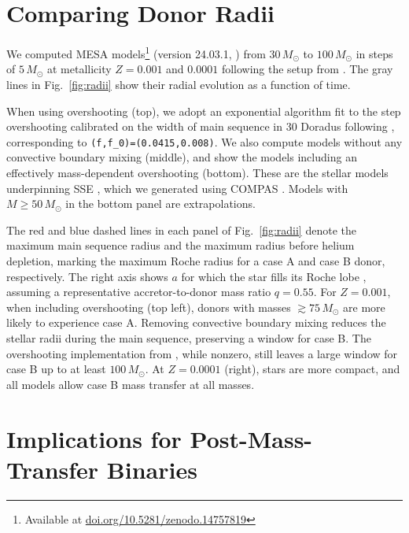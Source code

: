 \documentclass[twocolumn]{aastex631}
\DeclareRobustCommand{\Figref}[1]{Fig.~\ref{#1}}
\begin{document}
\section{Comparing Donor Radii}

We computed \textsc{MESA} models\footnote{Available at
  \href{https://doi.org/10.5281/zenodo.14757819}{doi.org/10.5281/zenodo.14757819}}
(version 24.03.1, \citealt{paxton:11, paxton:13, paxton:15, paxton:18,
  paxton:19, jermyn:23}) from $30 \, M_{\odot}$ to $100 \, M_{\odot}$
in steps of $5\,M_\odot$ at metallicity $Z=0.001$ and $0.0001$
following the setup from \cite{renzo:23}. The gray lines in
\Figref{fig:radii} show their radial evolution as a function of time.

When using overshooting (top), we adopt an exponential algorithm
\citep{herwig:00} fit to the step overshooting calibrated on the width
of main sequence in 30 Doradus \citep[$\sim{}0.335$ pressure scale
heights,][]{brott:11} following \cite{claret:18}, corresponding to
\texttt{(f,f\_0)=(0.0415,0.008)}. We also compute models without any
convective boundary mixing (middle), and show the \cite{pols:98}
models including an effectively mass-dependent overshooting (bottom).
These are the stellar models underpinning \textsc{SSE}
\citep{hurley:00}, which we generated using \textsc{COMPAS}
\citep{stevenson:17, vignagomez:18, riley:22}. Models with
$M\geq50\,M_\odot$ in the bottom panel are extrapolations.

The red and blue dashed lines in each panel of \Figref{fig:radii}
denote the maximum main sequence radius and the maximum radius before
helium depletion, marking the maximum Roche radius for a case A and
case B donor, respectively. The right axis shows $a$ for which the
star fills its Roche lobe \citep{eggleton:83}, assuming a
representative accretor-to-donor mass ratio $q=0.55$. For $Z=0.001$,
when including overshooting (top left), donors with masses
$ \gtrsim 75 \, M_{\odot}$ are more likely to experience case
A. Removing convective boundary mixing reduces the stellar radii
during the main sequence, preserving a window for case B. The
overshooting implementation from \cite{pols:98}, while nonzero, still
leaves a large window for case B up to at least $100 \, M_{\odot}$. At
$Z=0.0001$ (right), stars are more compact, and all models allow case
B mass transfer at all masses.

\section{Implications for Post-Mass-Transfer Binaries}
\end{document}
